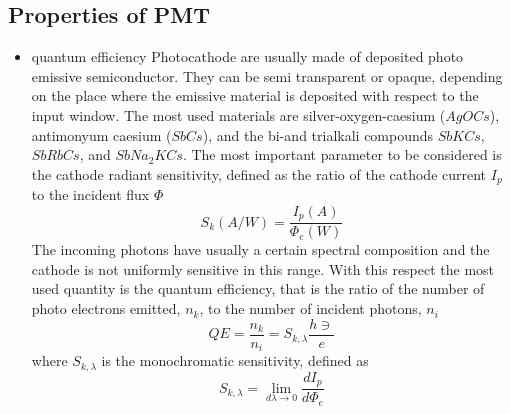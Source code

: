 \subsection{Properties of PMT}
\begin{itemize}
\item quantum efficiency
Photocathode are usually made of deposited photo emissive semiconductor. They can be semi transparent or opaque, depending on the place where the emissive material is deposited with respect to the input window.
The most used materials are silver-oxygen-caesium ($AgOCs$), antimonyum caesium ($SbCs$), and the bi-and trialkali compounds $SbKCs$, $SbRbCs$, and $SbNa_{2}KCs$. The most important parameter to be considered is the cathode radiant sensitivity, defined as the ratio of the cathode current $I_{p}$ to the incident flux $\Phi$
\begin{equation}
S_{k}(A/W)=\frac{I_{p}(A)}{\Phi _{e}(W)}
\end{equation}
The incoming photons have usually a certain spectral composition and the cathode is not uniformly sensitive in this range. With this respect the most used quantity is the quantum efficiency, that is the ratio of the number of photo electrons emitted, $n_{k}$, to the number of incident photons, $n_{i}$
\begin{equation}
QE = \frac{n_{k}}{n_{i}} = S_{k, \lambda} \frac{h\ni}{e}
\end{equation}
where $S_{k, \lambda}$ is the monochromatic sensitivity, defined as
\begin{equation}
S_{k, \lambda} = \lim_{d\lambda \to 0}\frac{dI_{p}}{d\Phi _{e}}
\end{equation}


\end{itemize}
